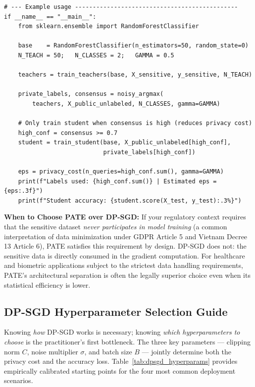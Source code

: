 \begin{lstlisting}
# --- Example usage ----------------------------------------------
if __name__ == "__main__":
    from sklearn.ensemble import RandomForestClassifier

    base    = RandomForestClassifier(n_estimators=50, random_state=0)
    N_TEACH = 50;   N_CLASSES = 2;   GAMMA = 0.5

    teachers = train_teachers(base, X_sensitive, y_sensitive, N_TEACH)

    private_labels, consensus = noisy_argmax(
        teachers, X_public_unlabeled, N_CLASSES, gamma=GAMMA)

    # Only train student when consensus is high (reduces privacy cost)
    high_conf = consensus >= 0.7
    student = train_student(base, X_public_unlabeled[high_conf],
                            private_labels[high_conf])

    eps = privacy_cost(n_queries=high_conf.sum(), gamma=GAMMA)
    print(f"Labels used: {high_conf.sum()} | Estimated eps = {eps:.3f}")
    print(f"Student accuracy: {student.score(X_test, y_test):.3%}")
\end{lstlisting}

\begin{svgraybox}
\textbf{When to Choose PATE over DP-SGD:} If your regulatory context requires that the sensitive dataset \emph{never participates in model training} (a common interpretation of data minimization under GDPR Article 5 and Vietnam Decree 13 Article 6), PATE satisfies this requirement by design. DP-SGD does not: the sensitive data is directly consumed in the gradient computation. For healthcare and biometric applications subject to the strictest data handling requirements, PATE's architectural separation is often the legally superior choice even when its statistical efficiency is lower.
\end{svgraybox}

\subsection{DP-SGD Hyperparameter Selection Guide}
\label{subsec:dpsgd_hyperparams}

Knowing \emph{how} DP-SGD works is necessary; knowing \emph{which hyperparameters to choose} is the practitioner's first bottleneck. The three key parameters --- clipping norm $C$, noise multiplier $\sigma$, and batch size $B$ --- jointly determine both the privacy cost and the accuracy loss. Table~\ref{tab:dpsgd_hyperparams} provides empirically calibrated starting points for the four most common deployment scenarios.

